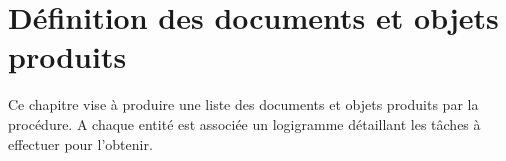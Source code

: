 \section{Définition des documents et objets produits}

Ce chapitre vise à produire une liste des documents et objets produits par
la procédure. A chaque entité est associée un logigramme détaillant les
tâches à effectuer pour l'obtenir.

\vfill
\pagebreak
